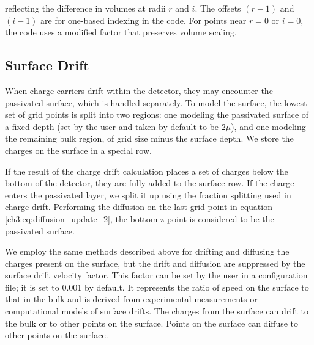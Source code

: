 \noindent
reflecting the difference in volumes at radii $r$ and $i$.
The offsets $(r-1)$ and $(i-1)$ are for one-based indexing in the code. For points near $r=0$ or $i=0$, the code uses a modified factor that preserves volume scaling. 


\subsection{Surface Drift}
When charge carriers drift within the detector, they may encounter the passivated surface, which is handled separately. To model the surface, the lowest set of grid points is split into two regions: one modeling the passivated surface of a fixed depth (set by the user and taken by default to be $2\mu$), and one modeling the remaining bulk region, of grid size minus the surface depth. We store the charges on the surface in a special row. 

If the result of the charge drift calculation places a set of charges below the bottom of the detector, they are fully added to the surface row. If the charge enters the passivated layer, we split it up using the fraction splitting used in charge drift. Performing the diffusion on the last grid point in equation \ref{ch3:eq:diffusion_update_2}, the bottom z-point is considered to be the passivated surface. 

We employ the same methods described above for drifting and diffusing the charges present on the surface, but the drift and diffusion are suppressed by the surface drift velocity factor. This factor can be set by the user in a configuration file; it is set to 0.001 by default. It represents the ratio of speed on the surface to that in the bulk and is derived from experimental measurements or computational models of surface drifts. The charges from the surface can drift to the bulk or to other points on the surface. Points on the surface can diffuse to other points on the surface.

